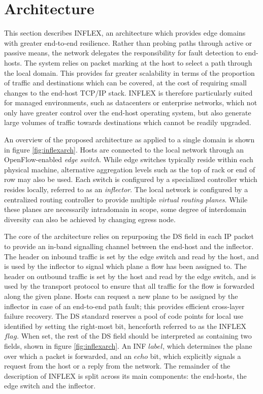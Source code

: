 \section{Architecture}
\label{section:inflex:arch}

This section describes INFLEX, an architecture which provides edge domains with greater end-to-end resilience.
Rather than probing paths through active or passive means, the network delegates the responsibility for fault detection to end-hosts.
The system relies on packet marking at the host to select a path through the local domain.
This provides far greater scalability in terms of the proportion of traffic and destinations which can be covered, at the cost of requiring small changes to the end-host \ac{TCP}/\ac{IP} stack.
INFLEX is therefore particularly suited for managed environments, such as datacenters or enterprise networks, which not only have greater control over the end-host operating system, but also generate large volumes of traffic towards destinations which cannot be readily upgraded.

An overview of the proposed architecture as applied to a single domain is shown in figure \ref{fig:inflexarch}.
Hosts are connected to the local network through an OpenFlow-enabled \emph{edge switch}.
While edge switches typically reside within each physical machine, alternative aggregation levels such as the top of rack or end of row may also be used.
Each switch is configured by a specialized controller which resides locally, referred to as an \emph{inflector}.
The local network is configured by a centralized routing controller to provide multiple \emph{virtual routing planes}.
While these planes are necessarily intradomain in scope, some degree of interdomain diversity can also be achieved by changing egress node.

The core of the architecture relies on repurposing the \ac{DS} field in each \ac{IP} packet to provide an in-band signalling channel between the end-host and the inflector.
The header on inbound traffic is set by the edge switch and read by the host, and is used by the inflector to signal which plane a flow has been assigned to.
The header on outbound traffic is set by the host and read by the edge switch, and is used by the transport protocol to ensure that all traffic for the flow is forwarded along the given plane.
Hosts can request a new plane to be assigned by the inflector in case of an end-to-end path fault; this provides efficient cross-layer failure recovery.
The \ac{DS} standard \cite{Blake:1998p370} reserves a pool of code points for local use identified by setting the right-most bit, henceforth referred to as the INFLEX $flag$.
When set, the rest of the \ac{DS} field should be interpreted as containing two fields, shown in figure \ref{fig:inflexarch}. 
An \ac{INF} $label$, which determines the plane over which a packet is forwarded, and an $echo$ bit, which explicitly signals a request from the host or a reply from the network.
The remainder of the description of INFLEX is split across its main components: the end-hosts, the edge switch and the inflector.

